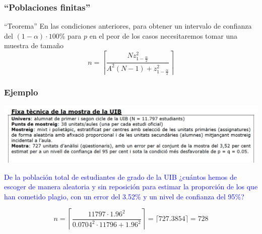 \documentclass[12pt,t]{beamer}\usepackage[]{graphicx}\usepackage[]{color}
\newcommand{\blue}[1]{\textcolor{blue}{#1}}
\theoremstyle{plain}
\theoremstyle{definition}
\begin{document}
\begin{frame}
\frametitle{``Poblaciones finitas''}

\begin{block}{``Teorema''}
En las condiciones anteriores, para obtener un intervalo de confianza  del $(1-\alpha)\cdot 100\%$ para $p$ en el peor de los casos necesitaremos tomar una muestra de tamaño 
$$
n=\left\lceil\frac{Nz_{1-\frac{\alpha}{2}}^2}{A^2(N-1)+z_{1-\frac{\alpha}{2}}^2}\right\rceil
$$
\end{block}
\end{frame}

\begin{frame}
\frametitle{Ejemplo}
\vspace*{-5ex}

\begin{center}
\hspace*{-0.5cm}\includegraphics[width=1.1\linewidth]{plagiUIB2.jpg}
\end{center}

\blue{De la población total de estudiantes de grado de la UIB ¿cuántos hemos de escoger de manera aleatoria  y sin  reposición para estimar la proporción de los que han cometido plagio, con un error del 3.52\% y un nivel de confianza  del 95\%?}

$$
n=\left\lceil\frac{11797\cdot 1.96^2}{0.0704^2\cdot 11796+1.96^2}\right\rceil=\lceil 727.3854\rceil=728
$$
\end{frame}
\end{document}
